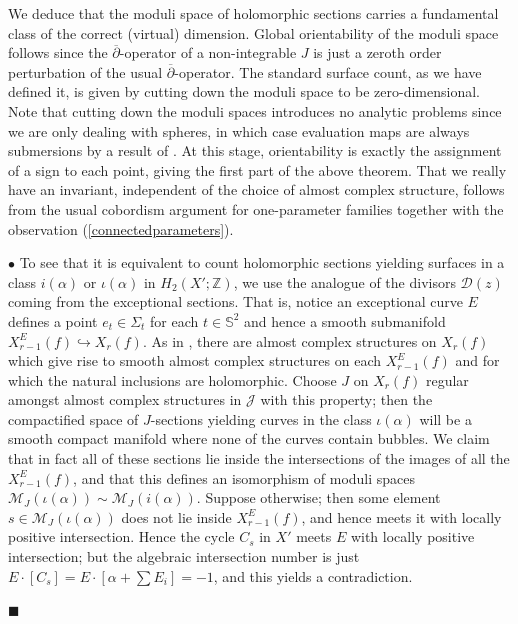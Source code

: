 \documentclass[10pt]{article}
\newcommand{\zz}{\mathbb{Z}}
\newcommand{\sss}{\mathbb{S}}
\newcommand{\cdbar}{\overline{\partial}}
\newenvironment{Pf}{\par \noindent{\sc Proof:} }{\quad $\blacksquare$ \par
\vspace{0.5cm}}
\begin{document}
\begin{Pf}
\vspace{0.2cm}

\noindent We deduce that the moduli space of holomorphic sections 
carries a fundamental class of the correct (virtual) dimension.
Global orientability of the moduli space follows since the
$\cdbar$-operator of a non-integrable $J$ is just a zeroth order
perturbation of the usual $\cdbar$-operator.  The standard surface
count, as we have defined it, is given by cutting down the moduli
space to be zero-dimensional.  Note that cutting down the moduli
spaces introduces no 
analytic problems since we are only dealing with spheres, in which
case evaluation maps are always submersions by a result of
\cite{McD-S:Jhol}.  At this stage, orientability is exactly
the assignment of a sign to each point, giving the first part of the
above theorem.  That we really have an invariant, independent of
the choice of almost complex structure, follows from the usual cobordism
argument for one-parameter families together with the observation
(\ref{connectedparameters}). 

\vspace{0.2cm}

\noindent $\bullet$ To see that it is equivalent to count holomorphic sections
yielding surfaces in a class $i(\alpha)$ or $\iota(\alpha)$ in
$H_2(X';\zz)$, we use the analogue of the divisors $\mathcal{D}(z)$
coming from the exceptional sections.  That is, notice an exceptional
curve $E$ defines a point $e_t \in \Sigma_t$ for each $t \in \sss^2$
and hence a smooth submanifold $X^E_{r-1}(f) \hookrightarrow X_r(f)$.
As in \cite{SKDIS}, there are almost complex structures on $X_r(f)$
which give rise to smooth almost complex structures on each
$X^E_{r-1}(f)$ and for which the natural inclusions are holomorphic.
Choose $J$ on $X_r(f)$ regular amongst almost complex structures in
$\mathcal{J}$ with this property; then the compactified space of $J$-sections
yielding curves in the class $\iota(\alpha)$ will be a smooth compact
manifold where none of the curves contain bubbles.  We claim that in
fact all of these sections lie inside the intersections of the images
of all the $X^E_{r-1}(f)$, and that this defines an isomorphism of
moduli spaces $\mathcal{M}_J (\iota(\alpha)) \sim \mathcal{M}_J
(i(\alpha))$.  Suppose otherwise; then some element $s \in
\mathcal{M}_J (\iota(\alpha))$ does not lie inside $X^E_{r-1}(f)$, and
hence meets it with locally positive intersection.  Hence the cycle
$C_s$ in $X'$ meets $E$ with locally positive intersection; but the
algebraic intersection number is just $E \cdot [C_s] = E \cdot [\alpha
+ \sum E_i] = -1$, and this yields a contradiction.  


\end{Pf}
\end{document}
